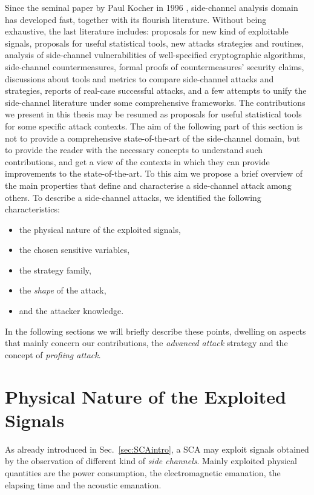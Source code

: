 Since the seminal paper by Paul Kocher in 1996 \cite{kocher1996timing}, side-channel analysis domain has developed fast, together with its flourish literature. Without being exhaustive, the last literature includes: proposals for new kind of exploitable signals, proposals for useful statistical tools, new attacks strategies and routines, analysis of side-channel vulnerabilities of well-specified cryptographic algorithms, side-channel countermeasures, formal proofs of countermeasures' security claims, discussions about tools and metrics to compare side-channel attacks and strategies, reports of real-case successful attacks, and a few attempts to unify the side-channel literature under some comprehensive frameworks. The contributions we present in this thesis may be resumed as proposals for useful statistical tools for some specific attack contexts. The aim of the following part of this section is not to provide a comprehensive state-of-the-art of the side-channel domain, but to provide the reader with the necessary concepts to understand such contributions, and get a view of the contexts in which they can provide improvements to the state-of-the-art. To this aim we propose a brief overview of the main properties that define and characterise a side-channel attack among others. To describe a side-channel attacks, we identified  the following characteristics: 
\begin{itemize}
\item the physical nature of the exploited signals,
\item the chosen sensitive variables,
\item the strategy family,
\item the \emph{shape} of the attack,
\item and the attacker knowledge.
\end{itemize} 

In the following sections we will briefly describe these points, dwelling on aspects that  mainly concern our contributions, \ie the \emph{advanced attack} strategy and the concept of \emph{profiing attack}. 

\section{Physical Nature of the Exploited Signals}\label{sec:physical_signals}
As already introduced in Sec.~\ref{sec:SCAintro}, a SCA may exploit signals obtained by the observation of different kind of \emph{side channels}. Mainly exploited physical quantities are the power consumption, the electromagnetic emanation, the elapsing time and the acoustic emanation. 

